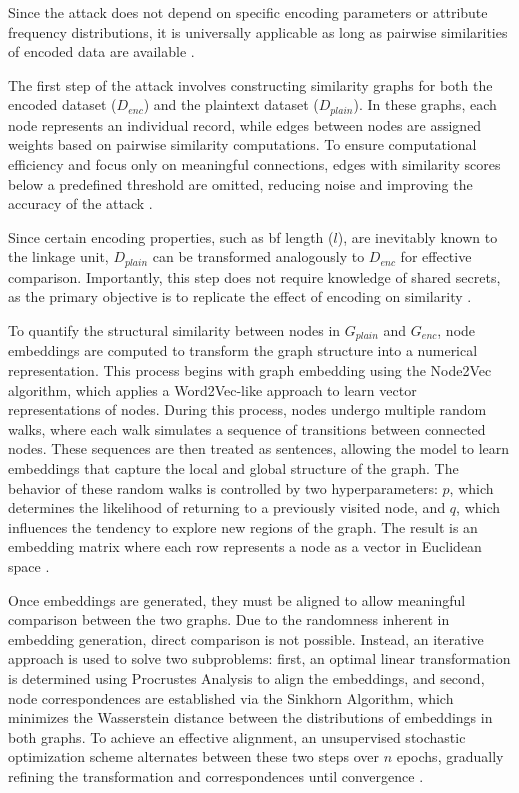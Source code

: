 Since the attack does not depend on specific encoding parameters or attribute frequency distributions, it is universally applicable as long as pairwise similarities of encoded data are available \cite{schaefer2024}.

The first step of the attack involves constructing similarity graphs for both the encoded dataset (\(D_{enc}\)) and the plaintext dataset (\(D_{plain}\)).
In these graphs, each node represents an individual record, while edges between nodes are assigned weights based on pairwise similarity computations.
To ensure computational efficiency and focus only on meaningful connections, edges with similarity scores below a predefined threshold are omitted, reducing noise and improving the accuracy of the attack \cite{schaefer2024}.

Since certain encoding properties, such as \ac{bf} length ($l$), are inevitably known to the linkage unit, $D_{plain}$ can be transformed analogously to $D_{enc}$ for effective comparison.
Importantly, this step does not require knowledge of shared secrets, as the primary objective is to replicate the effect of encoding on similarity \cite{schaefer2024}.

To quantify the structural similarity between nodes in \(G_{plain}\) and \(G_{enc}\), node embeddings are computed to transform the graph structure into a numerical representation.
This process begins with graph embedding using the Node2Vec algorithm, which applies a Word2Vec-like approach to learn vector representations of nodes.
During this process, nodes undergo multiple random walks, where each walk simulates a sequence of transitions between connected nodes.
These sequences are then treated as sentences, allowing the model to learn embeddings that capture the local and global structure of the graph.
The behavior of these random walks is controlled by two hyperparameters: \(p\), which determines the likelihood of returning to a previously visited node, and \(q\), which influences the tendency to explore new regions of the graph.
The result is an embedding matrix where each row represents a node as a vector in Euclidean space \cite{schaefer2024}.

Once embeddings are generated, they must be aligned to allow meaningful comparison between the two graphs.
Due to the randomness inherent in embedding generation, direct comparison is not possible.
Instead, an iterative approach is used to solve two subproblems: first, an optimal linear transformation is determined using Procrustes Analysis to align the embeddings, and second, node correspondences are established via the Sinkhorn Algorithm, which minimizes the Wasserstein distance between the distributions of embeddings in both graphs.
To achieve an effective alignment, an unsupervised stochastic optimization scheme alternates between these two steps over \(n\) epochs, gradually refining the transformation and correspondences until convergence \cite{schaefer2024}.

